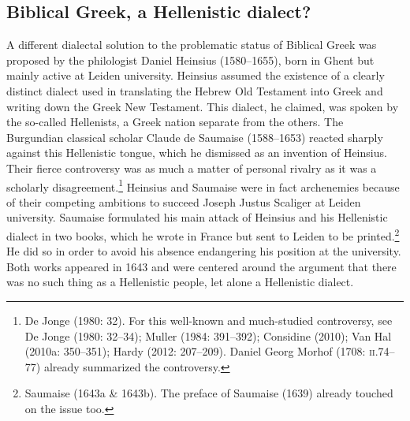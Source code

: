 \subsection{Biblical Greek, a Hellenistic dialect?}
\hypertarget{Toc19704832}{}\begin{styleStandard}
A different dialectal solution to the problematic status of Biblical Greek was proposed by the philologist Daniel Heinsius (1580–1655), born in Ghent but mainly active at Leiden university. Heinsius assumed the existence of a clearly distinct dialect used in translating the Hebrew Old Testament into Greek and writing down the Greek New Testament. This dialect, he claimed, was spoken by the so-called Hellenists, a Greek nation separate from the others. The Burgundian classical scholar Claude de Saumaise (1588–1653) reacted sharply against this Hellenistic tongue, which he dismissed as an invention of Heinsius. Their fierce controversy was as much a matter of personal rivalry as it was a scholarly disagreement.\footnote{ De Jonge (1980: 32). For this well-known and much-studied controversy, see De Jonge (1980: 32–34); Muller (1984: 391–392); Considine (2010); Van Hal (2010a: 350–351); Hardy (2012: 207–209). Daniel Georg Morhof (1708: \textsc{ii.}74–77) already summarized the controversy.} Heinsius and Saumaise were in fact archenemies because of their competing ambitions to succeed Joseph Justus Scaliger at Leiden university. Saumaise formulated his main attack of Heinsius and his Hellenistic dialect in two books, which he wrote in France but sent to Leiden to be printed.\footnote{ Saumaise (1643a \& 1643b). The preface of Saumaise (1639) already touched on the issue too.} He did so in order to avoid his absence endangering his position at the university. Both works appeared in 1643 and were centered around the argument that there was no such thing as a Hellenistic people, let alone a Hellenistic dialect.
\end{styleStandard}

